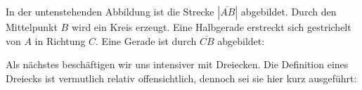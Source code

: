 \documentclass[ngerman, 12pt]{nssheetxea}
\begin{document}
\begin{example} In der untenstehenden Abbildung ist die Strecke $|\overline{AB}|$ abgebildet. Durch den Mittelpunkt $B$ wird ein Kreis erzeugt. Eine Halbgerade erstreckt sich gestrichelt von $A$ in Richtung $C$. Eine Gerade ist durch $\overline{CB}$ abgebildet:
\begin{center}
\end{center}
\end{example}

Als nächstes beschäftigen wir uns intensiver mit Dreiecken. Die Definition eines Dreiecks ist vermutlich relativ offensichtlich, dennoch sei sie hier kurz ausgeführt:
\end{document}

